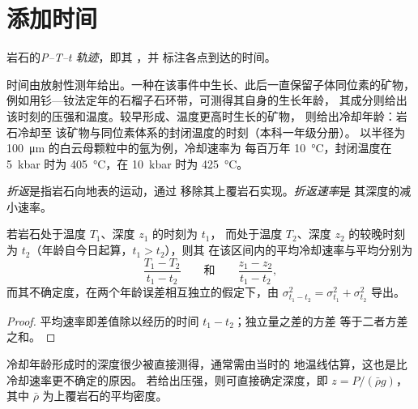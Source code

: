 \section{添加时间}\label{sec:b2:pt-paths:time}

\begin{definition}[P--T--t 轨迹]\label{def:b2:pt-paths:ptt}
岩石的\emph{P--T--t 轨迹}，即其 ，并
标注各点到达的时间。
\end{definition}

时间由放射性测年给出。一种在该事件中生长、此后一直保留子体同位素的矿物，
例如用钐—钕法定年的石榴子石环带，可测得其自身的生长年龄，
其成分则给出
该时刻的压强和温度。较早形成、温度更高时生长的矿物，
则给出冷却年龄：岩石冷却至
该矿物与同位素体系的封闭温度的时刻（本科一年级分册）。
以半径为 \qty{100}{\micro m} 的白云母颗粒中的氩为例，冷却速率为
每百万年 \qty{10}{\celsius}，封闭温度在
\qty{5}{kbar} 时为 \qty{405}{\celsius}，在 \qty{10}{kbar} 时为 \qty{425}{\celsius}。

\begin{definition}[折返；折返速率]\label{def:b2:pt-paths:exhumation}
\emph{折返}是指岩石向地表的运动，通过
移除其上覆岩石实现。\emph{折返速率}是
其深度的减小速率。
\end{definition}

\begin{proposition}[由两个定年点求速率]\label{prop:b2:pt-paths:rates}
若岩石处于温度 $T_1$、深度 $z_1$ 的时刻为 $t_1$，
而处于温度 $T_2$、深度 $z_2$ 的较晚时刻为 $t_2$（年龄自今日起算，$t_1 > t_2$），则其
在该区间内的平均冷却速率与平均分别为
\[
\frac{T_1 - T_2}{t_1 - t_2}
\qquad\text{和}\qquad
\frac{z_1 - z_2}{t_1 - t_2},
\]
而其不确定度，在两个年龄误差相互独立的假定下，由
$\sigma_{t_1 - t_2}^2 = \sigma_{t_1}^2 + \sigma_{t_2}^2$ 导出。
\end{proposition}

\begin{proof}
平均速率即差值除以经历的时间 $t_1 - t_2$；独立量之差的方差
等于二者方差之和。
\end{proof}

冷却年龄形成时的深度很少被直接测得，通常需由当时的
地温线估算，这也是比冷却速率更不确定的原因。
若给出压强，则可直接确定深度，即
$z = P/(\bar\rho g)$，其中 $\bar\rho$ 为上覆岩石的平均密度。

